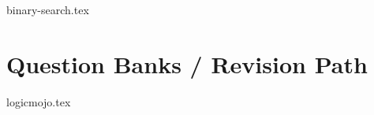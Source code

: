 \documentclass{../latex-setting/cmemoir}
\begin{document}

\frontmatter

\tableofcontents

\restoregeometry%

\mainmatter{}



{binary-search.tex}







\part{ Question Banks / Revision Path}
{logicmojo.tex}
% 
\end{document}
